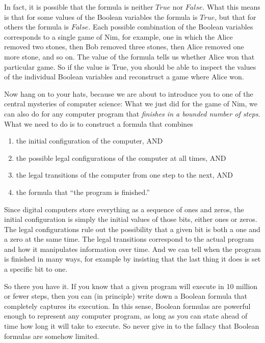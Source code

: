 In fact, it is possible that the formula is neither $True$ nor $False$. What this means is that for some values of the 
Boolean variables the formula is $True$, but that for others the formula is $False$. Each possible combination of the 
Boolean variables corresponds to a single game of Nim, for example, one in which the Alice removed two stones, then Bob removed
three stones, then Alice removed one more stone, and so on. The value of the formula tells us whether Alice won that 
particular game. So if the value is True, you should be able to inspect the values of the individual Boolean variables 
and reconstruct a game where Alice won.

Now hang on to your hats, because we are about to introduce you to one of the central mysteries of computer science: 
What we just did for the game of Nim, we can also do for any computer program that \emph{finishes in a bounded number of steps}. 
What we need to do is to construct a formula that combines
\begin{enumerate}
\item the initial configuration of the computer, AND
\item the possible legal configurations of the computer at all times, AND
\item the legal transitions of the computer from one step to the next, AND
\item the formula that ``the program is finished.''
\end{enumerate}
Since digital computers store everything as a sequence of ones and zeros, the initial configuration is simply the initial 
values of those bits, either ones or zeros. The legal configurations rule out the possibility that a given bit is both a 
one and a zero at the same time. The legal transitions correspond to the actual program and how it manipulates information 
over time. And we can tell when the program is finished in many ways, for example by insisting that the last thing it does 
is set a specific bit to one.

So there you have it. If you know that a given program will execute in 10 million or fewer steps, then you can (in principle) 
write down a Boolean formula that completely captures its execution. In this sense, Boolean formulas are powerful enough to 
represent any computer program, as long as you can state ahead of time how long it will take to execute. So never give in to 
the fallacy that Boolean formulas are somehow limited.

